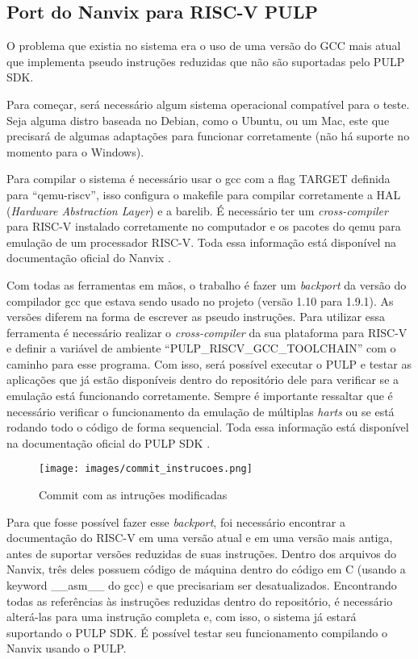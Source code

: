 \subsection{Port do Nanvix para RISC-V PULP}

O problema que existia no sistema era o uso de uma versão do GCC mais atual que implementa pseudo instruções reduzidas que não são suportadas pelo PULP SDK. 

Para começar, será necessário algum sistema operacional compatível para o teste. Seja alguma distro baseada no Debian, como o Ubuntu, ou um Mac, este que precisará de algumas adaptações para funcionar corretamente (não há suporte no momento para o Windows). 

Para compilar o sistema é necessário usar o gcc com a flag TARGET definida para “qemu-riscv”, isso configura o makefile para compilar corretamente a HAL (\textit{Hardware Abstraction Layer}) e a barelib. É necessário ter um \textit{cross-compiler} para RISC-V instalado corretamente no computador e os pacotes do qemu para emulação de um processador RISC-V. Toda essa informação está disponível na documentação oficial do Nanvix \cite{NanvixOS}. 

Com todas as ferramentas em mãos, o trabalho é fazer um \textit{backport} da versão do compilador gcc que estava sendo usado no projeto (versão 1.10 para 1.9.1). As versões diferem na forma de escrever as pseudo instruções. Para utilizar essa ferramenta é necessário realizar o \textit{cross-compiler} da sua plataforma para RISC-V e definir a variável de ambiente “PULP\_RISCV\_GCC\_TOOLCHAIN” com o caminho para esse programa. Com isso, será possível executar o PULP e testar as aplicações que já estão disponíveis dentro do repositório dele para verificar se a emulação está funcionando corretamente. Sempre é importante ressaltar que é necessário verificar o funcionamento da emulação de múltiplas \textit{harts} ou se está rodando todo o código de forma sequencial. Toda essa informação está disponível na documentação oficial 
do PULP SDK \cite{PulpSDKRepositorio}.

\begin{figure}[h!]
    \centering
    \texttt{[image: images/commit\_instrucoes.png]}
    \caption{Commit com as intruções modificadas \\ \cite{SolucaoInstrucoesDOWNGrade}} %
\end{figure}

Para que fosse possível fazer esse \textit{backport}, foi necessário encontrar a documentação do RISC-V em uma versão atual e em uma versão mais antiga, antes de suportar versões reduzidas de suas instruções. Dentro dos arquivos do Nanvix, três deles  possuem código de máquina dentro do código em C (usando a keyword \_\_asm\_\_ do gcc) e que precisariam ser desatualizados. Encontrando todas as referências às instruções reduzidas dentro do repositório, é necessário alterá-las para uma instrução completa e, com isso, o sistema já estará suportando o PULP SDK. É possível testar seu funcionamento compilando o Nanvix usando o PULP.
